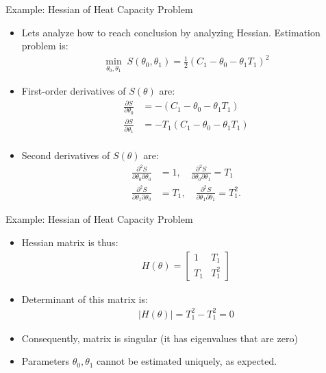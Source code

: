 \documentclass[9pt]{beamer}
\begin{document}
%
\begin{frame}{Example: Hessian of Heat Capacity Problem}

\begin{itemize}
\setlength{\itemsep}{10pt}
\item Lets analyze how to reach conclusion by analyzing Hessian. Estimation problem is:
\begin{align*}
\min_{\theta_0,\theta_1} \; S(\theta_0,\theta_1)=\frac{1}{2}(C_1-\theta_0-\theta_1T_1)^2
\end{align*}
\item First-order derivatives of $S(\theta)$ are:
\begin{align*}
\frac{\partial S}{\partial \theta_0}&=-(C_1-\theta_0-\theta_1 T_1)\\
\frac{\partial S}{\partial \theta_1}&=-T_1(C_1-\theta_0-\theta_1 T_1)\\
\end{align*}
\item Second derivatives of $S(\theta)$ are:
\begin{align*}
\frac{\partial^2 S}{\partial \theta_0 \partial \theta_0}&=1,\quad \frac{\partial^2 S}{\partial \theta_0\partial \theta_1}=T_1\\
\frac{\partial^2 S}{\partial \theta_1 \partial \theta_0}&=T_1,\quad \frac{\partial^2 S}{\partial \theta_1 \partial \theta_1}=T_1^2.
\end{align*}
\end{itemize}

\end{frame}

%
\begin{frame}{Example: Hessian of Heat Capacity Problem}

\begin{itemize}
\setlength{\itemsep}{10pt}
\item Hessian matrix is thus:
\begin{align*}
H(\theta)=\left[\begin{array}{cc}1&T_1\\ T_1 & T_1^2\end{array}\right]
\end{align*}
\item Determinant of this matrix is:
\begin{align*}
|H(\theta)|=T_1^2-T_1^2=0
\end{align*}
\item Consequently, matrix is singular (it has eigenvalues that are zero)
\item Parameters $\theta_0,\theta_1$ cannot be estimated uniquely, as expected. 
\end{itemize}

\end{frame}
\end{document}
